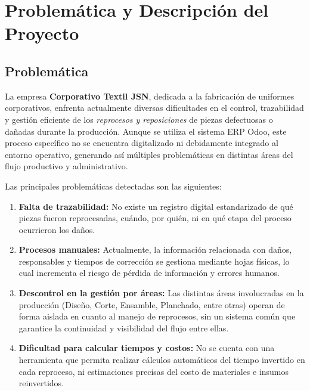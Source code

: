 \documentclass[12pt,letterpaper,spanish]{report}
\begin{document}
\chapter{Problemática y Descripción del Proyecto}
\newpage

\section{Problemática}

La empresa \textbf{Corporativo Textil JSN}, dedicada a la fabricación de uniformes corporativos, enfrenta actualmente diversas dificultades en el control, trazabilidad y gestión eficiente de los \textit{reprocesos y reposiciones} de piezas defectuosas o dañadas durante la producción. Aunque se utiliza el sistema ERP Odoo, este proceso específico no se encuentra digitalizado ni debidamente integrado al entorno operativo, generando así múltiples problemáticas en distintas áreas del flujo productivo y administrativo.

Las principales problemáticas detectadas son las siguientes:

\begin{enumerate}
    \item \textbf{Falta de trazabilidad:} No existe un registro digital estandarizado de qué piezas fueron reprocesadas, cuándo, por quién, ni en qué etapa del proceso ocurrieron los daños.
    
    \item \textbf{Procesos manuales:} Actualmente, la información relacionada con daños, responsables y tiempos de corrección se gestiona mediante hojas físicas, lo cual incrementa el riesgo de pérdida de información y errores humanos.
    
    \item \textbf{Descontrol en la gestión por áreas:} Las distintas áreas involucradas en la producción (Diseño, Corte, Ensamble, Planchado, entre otras) operan de forma aislada en cuanto al manejo de reprocesos, sin un sistema común que garantice la continuidad y visibilidad del flujo entre ellas.
    
    \item \textbf{Dificultad para calcular tiempos y costos:} No se cuenta con una herramienta que permita realizar cálculos automáticos del tiempo invertido en cada reproceso, ni estimaciones precisas del costo de materiales e insumos reinvertidos.

\end{enumerate}
\end{document}
